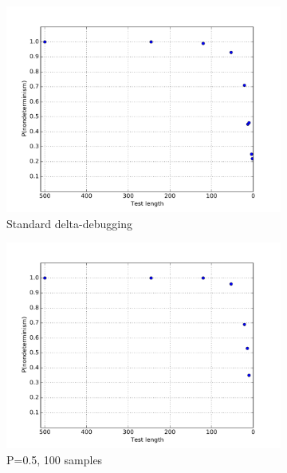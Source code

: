 \begin{figure}
\centering 
\begin{subfigure}{0.67\columnwidth}
\centering
\includegraphics[width=\columnwidth]{lengthddmin}
\caption{Standard delta-debugging}
\label{fig:p1}
\end{subfigure}
\begin{subfigure}{0.67\columnwidth}
\centering
\includegraphics[width=\columnwidth]{lengthddminforcep}
\caption{P=0.5, 100 samples}
\label{fig:p2}
\end{subfigure}
\begin{subfigure}{0.67\columnwidth}
\centering

\end{subfigure}
\end{figure}
